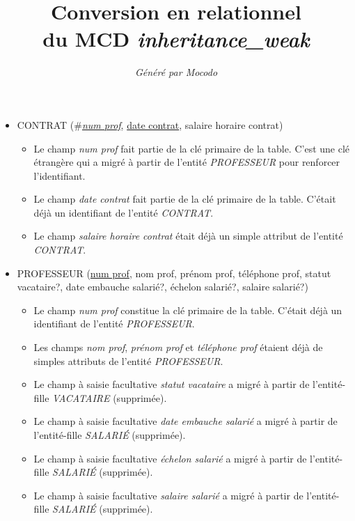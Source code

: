 \documentclass[a4paper]{article}
\title{Conversion en relationnel\\du MCD \emph{inheritance\_weak}}
\author{\emph{Généré par Mocodo}}
\newcommand{\relat}[1]{\textsc{#1}}
\newcommand{\attr}[1]{#1}
\newcommand{\prim}[1]{\uline{#1}}
\newcommand{\foreign}[1]{\#\textsl{#1}}
\begin{document}
\maketitle

\begin{itemize}
  \item \relat{CONTRAT} (\foreign{\prim{num prof}}, \prim{date contrat}, \attr{salaire horaire contrat})
  \begin{itemize}
    \item Le champ \emph{num prof} fait partie de la clé primaire de la table. C'est une clé étrangère qui a migré à partir de l'entité \emph{PROFESSEUR} pour renforcer l'identifiant.
    \item Le champ \emph{date contrat} fait partie de la clé primaire de la table. C'était déjà un identifiant de l'entité \emph{CONTRAT}.
    \item Le champ \emph{salaire horaire contrat} était déjà un simple attribut de l'entité \emph{CONTRAT}.
  \end{itemize}

  \item \relat{PROFESSEUR} (\prim{num prof}, \attr{nom prof}, \attr{prénom prof}, \attr{téléphone prof}, \attr{statut vacataire?}, \attr{date embauche salarié?}, \attr{échelon salarié?}, \attr{salaire salarié?})
  \begin{itemize}
    \item Le champ \emph{num prof} constitue la clé primaire de la table. C'était déjà un identifiant de l'entité \emph{PROFESSEUR}.
    \item Les champs \emph{nom prof}, \emph{prénom prof} et \emph{téléphone prof} étaient déjà de simples attributs de l'entité \emph{PROFESSEUR}.
    \item Le champ à saisie facultative \emph{statut vacataire} a migré à partir de l'entité-fille \emph{VACATAIRE} (supprimée).
    \item Le champ à saisie facultative \emph{date embauche salarié} a migré à partir de l'entité-fille \emph{SALARIÉ} (supprimée).
    \item Le champ à saisie facultative \emph{échelon salarié} a migré à partir de l'entité-fille \emph{SALARIÉ} (supprimée).
    \item Le champ à saisie facultative \emph{salaire salarié} a migré à partir de l'entité-fille \emph{SALARIÉ} (supprimée).
  \end{itemize}

\end{itemize}
\end{document}
